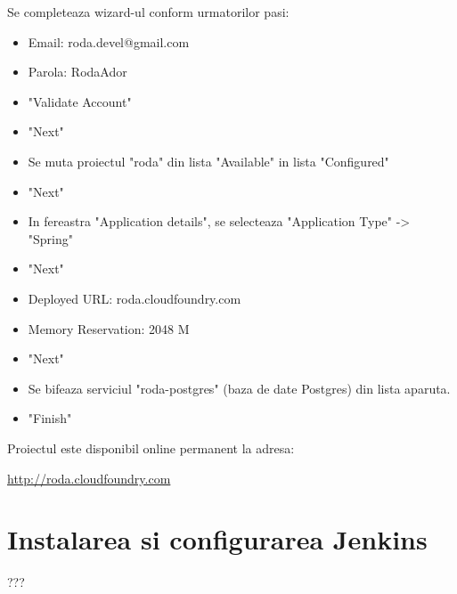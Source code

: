 Se completeaza wizard-ul conform urmatorilor pasi:
\begin{itemize}
  \item 
Email: roda.devel@gmail.com
  \item 
Parola: RodaAdor
  \item 
"Validate Account"
  \item 
"Next"
  \item 
Se muta proiectul "roda" din lista "Available" in lista "Configured"
  \item 
"Next"
  \item 
In fereastra "Application details", se selecteaza "Application Type" -> "Spring"
  \item 
"Next"
  \item 
Deployed URL: roda.cloudfoundry.com
  \item 
Memory Reservation: 2048 M
  \item 
"Next"
  \item 
Se bifeaza serviciul "roda-postgres" (baza de date Postgres) din lista aparuta.
  \item 
"Finish"
\end{itemize}

Proiectul este disponibil online permanent la adresa:

\url{http://roda.cloudfoundry.com}

\section{Instalarea si configurarea Jenkins}

???
